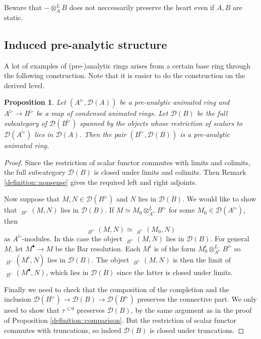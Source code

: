 \documentclass{article}
\theoremstyle{plain}
\newtheorem{prop}[thm]{Proposition}
\theoremstyle{definition}
\theoremstyle{remark}
\DeclareMathOperator{\rhoms}{\underline{RHom}}
\newcommand{\dten}{\otimes ^{L}}
\newcommand{\huflag}{\triangleright}
\newcommand{\D}{\mathcal{D}}
\begin{document}
Beware that $ -\dten _{A} B $ does not neccessarily preserve the heart even if $ A,B $ are static.

\subsection{Induced pre-analytic structure}

A lot of examples of (pre-)analytic rings arises from a certain base ring through the following construction.
Note that it is easier to do the construction on the derived level.
\begin{prop}
Let $ (A ^{\huflag}, \D (A)) $ be a pre-analytic animated ring and $ A ^{\huflag}\to B ^{\huflag} $ be a map of condensed animated rings.
Let $ \D (B) $ be the full subcategory of $ \D (B ^{\huflag}) $ spanned by the objects whose restriction of scalars to $ \D (A ^{\huflag}) $
lies in $ \D (A) $. Then the pair $ (B ^{\huflag}, \D (B)) $ is a pre-analytic animated ring.
\end{prop}

\begin{proof}
Since the restriction of scalar functor commutes with limits and colimits, the full subcategory
$ \D (B) $ is closed under limits and colimits.
Then Remark \ref{definition::nonsense} gives the required left and right adjoints.

Now suppose that $ M, N\in \D (B ^{\huflag}) $ and $ N $ lies in $ \D (B) $.
We would like to show that $ \rhoms _{B ^{\huflag}}(M, N) $ lies in $ \D (B) $.
If $ M \simeq M_0 \dten _{A ^{\huflag}} B ^{\huflag} $ for some $ M _{0}\in \D (A ^{\huflag}) $,
then
\begin{equation*}
\rhoms _{B ^{\huflag}}(M, N)\simeq \rhoms _{A ^{\huflag}}(M_0, N)
\end{equation*}
as $ A ^{\huflag} $-modules.
In this case the object $ \rhoms _{B ^{\huflag}}(M, N) $ lies in $ \D (B) $.
For general $ M $, let $ M ^{\bullet}\to M $ be the Bar resolution. Each $ M ^{i} $ is of the form $ M ^{i}_{0}\dten _{A ^{\huflag}}B ^{\huflag} $
so $ \rhoms _{B ^{\huflag}}(M ^{i}, N) $ lies in $ \D (B) $.
The object $ \rhoms _{B ^{\huflag}}(M, N) $ is then the limit of $ \rhoms _{B ^{\huflag}}(M ^{\bullet}, N) $,
which lies in $ \D (B) $ since the latter is closed under limits.

Finally we need to check that the composition of the completion and the inclusion
$ \D (B ^{\huflag})\to \D (B)\to \D (B ^{\huflag}) $ preserves the connective part.
We only need to show that $ \tau ^{\leq 0} $ preserves $ \D (B) $, by the same argument as in the proof of Proposition
\ref{definition::comparison}.
But the restriction of scalar functor commutes with truncations, so indeed $ \D (B) $ is closed under truncations.
\end{proof}
\end{document}
